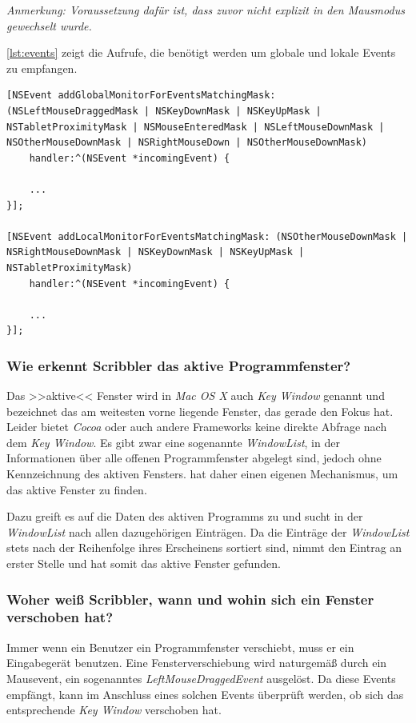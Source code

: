 \bigskip \emph{Anmerkung: \graffito{\(\clubsuit\)} Voraussetzung dafür ist, dass zuvor nicht explizit in den Mausmodus gewechselt wurde.}
\bigskip

\autoref{lst:events} zeigt die Aufrufe, die benötigt werden um globale und lokale Events zu empfangen.

\lstset{language=[Objective]C}
\begin{lstlisting}[float,caption=Global and Local Event Monitoring,label=lst:events]
[NSEvent addGlobalMonitorForEventsMatchingMask: (NSLeftMouseDraggedMask | NSKeyDownMask | NSKeyUpMask | NSTabletProximityMask | NSMouseEnteredMask | NSLeftMouseDownMask | NSOtherMouseDownMask | NSRightMouseDown | NSOtherMouseDownMask)
    handler:^(NSEvent *incomingEvent) {
	
    ...
}];	

[NSEvent addLocalMonitorForEventsMatchingMask: (NSOtherMouseDownMask | NSRightMouseDownMask | NSKeyDownMask | NSKeyUpMask | NSTabletProximityMask)
    handler:^(NSEvent *incomingEvent) {

    ...
}];	
\end{lstlisting}

\subsubsection* {Wie erkennt Scribbler das aktive Programmfenster?} 
Das >>aktive<< Fenster wird in \emph{Mac OS X} auch \emph{Key Window} genannt und bezeichnet das am weitesten vorne liegende Fenster, das gerade den Fokus hat. Leider bietet \emph{Cocoa} oder auch andere Frameworks keine direkte Abfrage nach dem \emph{Key Window}. Es gibt zwar eine sogenannte \emph{WindowList}, in der Informationen über alle offenen Programmfenster abgelegt sind, jedoch ohne Kennzeichnung des aktiven Fensters. \scribbler hat daher einen eigenen Mechanismus, um das aktive Fenster zu finden.

Dazu greift es auf die Daten des aktiven Programms zu und sucht in der \emph{WindowList} nach allen dazugehörigen Einträgen. Da die Einträge der \emph{WindowList} stets nach der Reihenfolge ihres Erscheinens sortiert sind, nimmt \scribbler den Eintrag an erster Stelle und hat somit das aktive Fenster gefunden.

\subsubsection* {Woher weiß Scribbler, wann und wohin sich ein Fenster verschoben hat?}
Immer wenn ein Benutzer ein Programmfenster verschiebt, muss er ein Eingabegerät benutzen. Eine Fensterverschiebung wird naturgemäß durch ein Mausevent, ein sogenanntes \emph{LeftMouseDraggedEvent} ausgelöst. Da \scribbler diese Events empfängt, kann im Anschluss eines solchen Events überprüft werden, ob sich das entsprechende \emph{Key Window} verschoben hat. 

